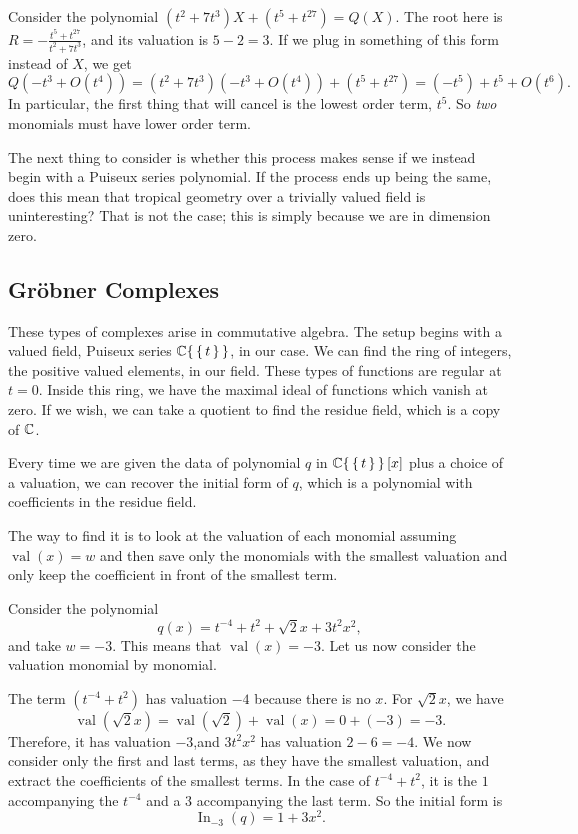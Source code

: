 \documentclass[12pt]{memoir}
\DeclareMathOperator{\val}{val}
\theoremstyle{definition}
\begin{document}
    \begin{Ex}
        Consider the polynomial $(t^2+7t^3)X+(t^5+t^{27})=Q(X)$. The root here is $R=-\frac{t^5+t^{27}}{t^2+7t^3}$, and its valuation is $5-2=3$. If we plug in something of this form instead of $X$, we get 
        $$Q(-t^3+O(t^4))=(t^2+7t^3)(-t^3+O(t^4))+(t^5+t^{27})=(-t^5)+t^5+O(t^6).$$
        In particular, the first thing that will cancel is the lowest order term, $t^5$. So \emph{two} monomials must have lower order term.
    \end{Ex}

The next thing to consider is whether this process makes sense if we instead begin with a Puiseux series polynomial. If the process ends up being the same, does this mean that tropical geometry over a trivially valued field is uninteresting? That is not the case; this is simply because we are in dimension zero. 

\subsection{Gr\"obner Complexes}

These types of complexes arise in commutative algebra. The setup begins with a valued field, Puiseux series $\mathbb{C}\{\,\{\,t\,\}\,\}$, in our case. We can find the ring of integers, the positive valued elements, in our field. These types of functions are regular at $t=0$. Inside this ring, we have the maximal ideal of functions which vanish at zero. If we wish, we can take a quotient to find the residue field, which is a copy of $\mathbb{C}$.\par 
Every time we are given the data of polynomial $q$ in $\mathbb{C}\{\,\{\,t\,\}\,\}\left\lbrack x\right\rbrack$ plus a choice of a valuation, we can recover the initial form of $q$, which is a polynomial with coefficients in the residue field.\par 
The way to find it is to look at the valuation of each monomial assuming $\val(x)=w$ and then save only the monomials with the smallest valuation and only keep the coefficient in front of the smallest term.

\begin{Ex}
    Consider the polynomial 
    $$q(x)=t^{-4}+t^{2}+\sqrt{2}x+3t^2x^2,$$
    and take $w=-3$. This means that $\val(x)=-3$. Let us now consider the valuation monomial by monomial.\par 
    The term $(t^{-4}+t^{2})$ has valuation $-4$ because there is no $x$. For $\sqrt{2}x$, we have
    $$\val(\sqrt{2}x)=\val(\sqrt{2})+\val(x)=0+(-3)=-3.$$
    Therefore, it has valuation $-3$,and $3t^2x^2$ has valuation $2-6=-4$. We now consider only the first and last terms, as they have the smallest valuation, and extract the coefficients of the smallest terms. In the case of $t^{-4}+t^{2}$, it is the $1$ accompanying the $t^{-4}$ and a $3$ accompanying the last term. So the initial form is 
    $$\operatorname{In}_{-3}(q)=1+3x^2.$$
\end{Ex}
\end{document}
